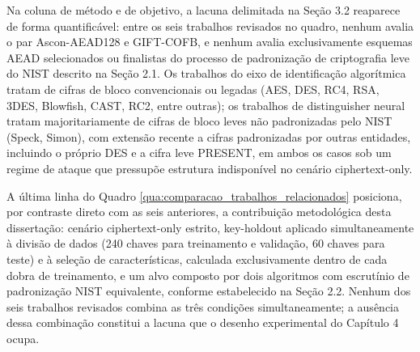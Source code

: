 Na coluna de método e de objetivo, a lacuna delimitada na Seção 3.2 reaparece de forma quantificável: entre os seis trabalhos revisados no quadro, nenhum avalia o par Ascon-AEAD128 e GIFT-COFB, e nenhum avalia exclusivamente esquemas AEAD selecionados ou finalistas do processo de padronização de criptografia leve do NIST descrito na Seção 2.1. Os trabalhos do eixo de identificação algorítmica tratam de cifras de bloco convencionais ou legadas (AES, DES, RC4, RSA, 3DES, Blowfish, CAST, RC2, entre outras); os trabalhos de distinguisher neural tratam majoritariamente de cifras de bloco leves não padronizadas pelo NIST (Speck, Simon), com extensão recente a cifras padronizadas por outras entidades, incluindo o próprio DES e a cifra leve PRESENT, em ambos os casos sob um regime de ataque que pressupõe estrutura indisponível no cenário ciphertext-only.

A última linha do Quadro \ref{qua:comparacao_trabalhos_relacionados} posiciona, por contraste direto com as seis anteriores, a contribuição metodológica desta dissertação: cenário ciphertext-only estrito, key-holdout aplicado simultaneamente à divisão de dados (240 chaves para treinamento e validação, 60 chaves para teste) e à seleção de características, calculada exclusivamente dentro de cada dobra de treinamento, e um alvo composto por dois algoritmos com escrutínio de padronização NIST equivalente, conforme estabelecido na Seção 2.2. Nenhum dos seis trabalhos revisados combina as três condições simultaneamente; a ausência dessa combinação constitui a lacuna que o desenho experimental do Capítulo 4 ocupa.

